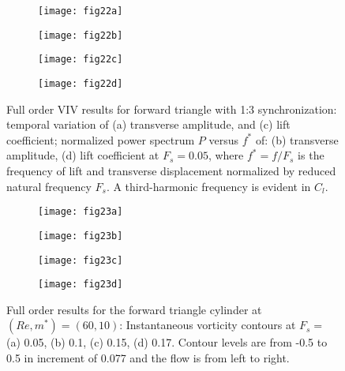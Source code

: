 \documentclass{jfm}
\begin{document}
\begin{figure}
\centering
\begin{subfigure}{0.495\textwidth}
\centering
    \texttt{[image: fig22a]}
    \caption{}
    \label{fig:Fs_05_y}
    \end{subfigure} 
\begin{subfigure}{0.495\textwidth} 
\centering
 \texttt{[image: fig22b]}
	\caption{}
	\label{fig:Fs_05_y_f}
	\end{subfigure}	
\begin{subfigure}{0.495\textwidth} 
\centering
 \texttt{[image: fig22c]}
	\caption{}
	\label{fig:Fs_05_cl}
	\end{subfigure}	
\begin{subfigure}{0.495\textwidth} 
\centering
 \texttt{[image: fig22d]}
	\caption{}
	\label{fig:Fs_05_cl_f}
	\end{subfigure}
        \caption{Full order VIV results for forward triangle with 1:3 synchronization:
        temporal variation of 
        (a) transverse amplitude, and (c) lift coefficient; 
        normalized power spectrum $P$ versus $f^*$ of: 
        (b) transverse amplitude, (d) lift coefficient at $F_s=0.05$, where  $f^*=f/F_s$ 
        is the frequency of lift and transverse displacement normalized 
        by reduced natural frequency $F_s$. 
        A third-harmonic frequency is evident in $C_l$.}
	\label{fig:3harmonic}
\end{figure}

 
 \begin{figure}
\begin{subfigure}{0.495\textwidth}
\centering
    \texttt{[image: fig23a]}
    \caption{}
    \label{fig:trian1_fs005}
    \end{subfigure} 
\begin{subfigure}{0.495\textwidth} 
\centering
 \texttt{[image: fig23b]}
	\caption{}
	\label{fig:trian1_fs010}
	\end{subfigure}	
\begin{subfigure}{0.495\textwidth} 
\centering
 \texttt{[image: fig23c]}
	\caption{}
	\label{fig:trian1_fs015}
	\end{subfigure}	
\begin{subfigure}{0.495\textwidth} 
\centering
 \texttt{[image: fig23d]}
	\caption{}
	\label{fig:trian1_fs017}
	\end{subfigure}	
        \caption{Full order results for the forward triangle cylinder at  $(Re, m^*)=(60, 10)$:
                Instantaneous vorticity contours at $F_{s}=$ (a) 0.05, (b) 0.1, (c) 0.15, (d) 0.17. 
Contour levels are from -0.5 to 0.5 in increment of 0.077 and the flow is from left to right.}
	\label{fig:vor_backward}
\end{figure}
\end{document}
